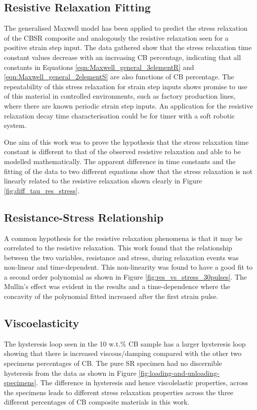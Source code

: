 \subsection{Resistive Relaxation Fitting}
The generalised Maxwell model has been applied to predict the stress relaxation of the CBSR composite and analogously the resistive relaxation seen for a positive strain step input. The data gathered show that the stress relaxation time constant values decrease with an increasing CB percentage, indicating that all constants in Equations \ref{eqn:Maxwell_general_3elementR} and \ref{eqn:Maxwell_general_2elementS} are also functions of CB percentage. The repeatability of this stress relaxation for strain step inputs shows promise to use of this material in controlled environments, such as factory production lines, where there are known periodic strain step inputs. An application for the resistive relaxation decay time characterisation could be for timer with a soft robotic system.

One aim of this work was to prove the hypothesis that the stress relaxation time constant is different to that of the observed resistive relaxation and able to be modelled mathematically. The apparent difference in time constants and the fitting of the data to two different equations show that the stress relaxation is not linearly related to the resistive relaxation shown clearly in Figure \ref{fig:diff_tau_res_stress}.


\subsection{Resistance-Stress Relationship}
A common hypothesis for the resistive relaxation phenomena is that it may be correlated to the resistive relaxation. This work found that the relationship between the two variables, resistance and stress, during relaxation events was non-linear and time-dependent. This non-linearity was found to have a good fit to a second order polynomial as shown in Figure \ref{fig:res_vs_stress_30pulses}. The Mullin's effect was evident in the results and a time-dependence where the concavity of the polynomial fitted increased after the first strain pulse.


\subsection{Viscoelasticity}
The hysteresis loop seen in the 10 w.t.\% CB sample has a larger hysteresis loop showing that there is increased viscous/damping compared with the other two specimens percentages of CB. The pure SR specimen had no discernible hysteresis from the data as shown in Figure \ref{fig:loading-and-unloading-specimens}.  The difference in hysteresis and hence viscolelastic properties, across the specimens leads to different stress relaxation properties across the three different percentages of CB composite materials in this work.


